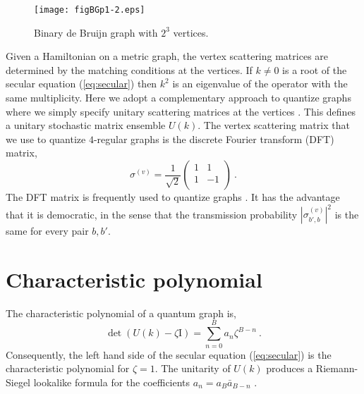 \documentclass[doublecol]{epl2}
\newcommand{\UI}{\mathrm{I}}
\begin{document}
\begin{figure}[htbp!]
	\texttt{[image: figBGp1-2.eps]}
	\caption{Binary de Bruijn graph with $2^3$ vertices.}
	\label{fig: binary V=8}
\end{figure}

Given a Hamiltonian on a metric graph, the vertex scattering matrices are determined by the matching conditions at the vertices.  If $k\neq 0$ is a root of the secular equation (\ref{eq:secular}) then $k^2$ is an eigenvalue of the operator with the same multiplicity.  Here we adopt a complementary approach to quantize graphs where we simply specify unitary scattering matrices at the vertices \cite{T01}.  This defines a unitary stochastic matrix ensemble $U(k)$.  The vertex scattering matrix that we use to quantize $4$-regular graphs is the discrete Fourier transform (DFT) matrix,
\begin{equation}
\sigma^{(v)} = \frac{1}{\sqrt{2}}  
\begin{pmatrix}
1 & 1 \\
1 & -1 \\
\end{pmatrix}
\ .
\label{eq:DFTmatrix}
\end{equation}
The DFT matrix is frequently used to quantize graphs \cite{GS06}.  It has the advantage that it is democratic, in the sense that the transmission probability $|\sigma_{b',b}^{(v)}|^2$ is the same for every pair $b,b'$. 

\section{Characteristic polynomial}

The characteristic polynomial of a quantum graph is,
\begin{equation} 
\label{eq:charpoly}
\det(U (k) - \zeta \UI) = \sum\limits_{n=0}^{B} a_n \zeta^{B-n} \ .
\end{equation}
Consequently, the left hand side of the secular equation (\ref{eq:secular}) is the characteristic polynomial for $\zeta=1$.   The unitarity of $U(k)$ produces a Riemann-Siegel lookalike formula for the coefficients $a_n=a_B\bar{a}_{B-n}$ \cite{KS99}.  
\end{document}
